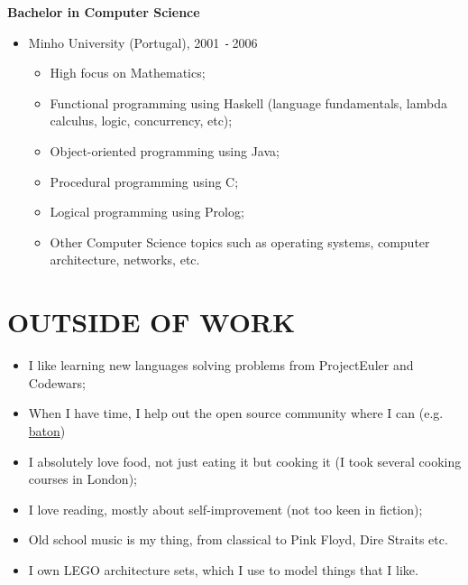 \documentclass{res}
\def\Minus{\texttt{-}\,}
\begin{document}
\begin{resume}
    {\bf Bachelor in Computer Science}
    \begin{itemize}
      \item[] Minho University (Portugal), 2001 \Minus 2006
      \begin{itemize}
        \item High focus on Mathematics;
        \item Functional programming using Haskell (language fundamentals, lambda calculus, logic, concurrency, etc);
        \item Object-oriented programming using Java;
        \item Procedural programming using C;
        \item Logical programming using Prolog;
        \item Other Computer Science topics such as operating systems, computer architecture, networks, etc.
      \end{itemize}
    \end{itemize}

\section{OUTSIDE OF WORK}
\vspace{0.1in}
\begin{itemize}
  \item I like learning new languages solving problems from ProjectEuler and
  Codewars;
  \item When I have time, I help out the open source community where I can
  (e.g. \href{https://github.com/digital-science/baton}{baton})
  \item I absolutely love food, not just eating it but cooking it (I took
  several cooking courses in London);
  \item I love reading, mostly about self-improvement (not too keen in fiction);
  \item Old school music is my thing, from classical to Pink Floyd, Dire Straits etc.
  \item I own LEGO architecture sets, which I use to model things that I like.
\end{itemize}

\end{resume}
\end{document}
